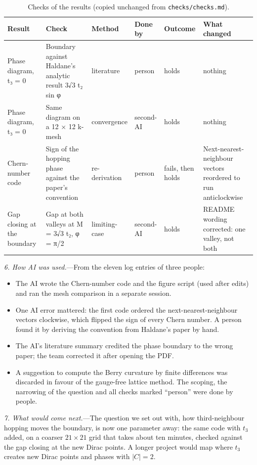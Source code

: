 \documentclass[reprint,aps,prl,superscriptaddress,amsmath,amssymb,floatfix]{revtex4-2}
\begin{document}
\begin{table}[t]
  \caption{Checks of the results (copied unchanged from \texttt{checks/checks.md}).}
  \label{tab:checks}
  \begin{ruledtabular}
  \begin{tabular}{p{2.6cm}p{4.0cm}lllp{3.8cm}}
    Result & Check & Method & Done by & Outcome & What changed \\
    \hline
    Phase diagram, t₃ = 0 & Boundary against Haldane's analytic result 3√3 t₂ sin φ & literature & person & holds & nothing \\
    Phase diagram, t₃ = 0 & Same diagram on a 12 × 12 k-mesh & convergence & second-AI & holds & nothing \\
    Chern-number code & Sign of the hopping phase against the paper's convention & re-derivation & person & fails, then holds & Next-nearest-neighbour vectors reordered to run anticlockwise \\
    Gap closing at the boundary & Gap at both valleys at M = 3√3 t₂, φ = π/2 & limiting-case & second-AI & holds & README wording corrected: one valley, not both \\
  \end{tabular}
  \end{ruledtabular}
\end{table}

\textit{6. How AI was used.}---From the eleven log entries of three people:
\begin{itemize}\setlength{\itemsep}{0pt}
  \item The AI wrote the Chern-number code and the figure script (used after edits) and ran the
  mesh comparison in a separate session.
  \item One AI error mattered: the first code ordered the next-nearest-neighbour vectors
  clockwise, which flipped the sign of every Chern number. A person found it by deriving the
  convention from Haldane's paper by hand.
  \item The AI's literature summary credited the phase boundary to the wrong paper; the team
  corrected it after opening the PDF.
  \item A suggestion to compute the Berry curvature by finite differences was discarded in favour
  of the gauge-free lattice method. The scoping, the narrowing of the question and all checks
  marked ``person'' were done by people.
\end{itemize}

\textit{7. What would come next.}---The question we set out with, how third-neighbour hopping
moves the boundary, is now one parameter away: the same code with $t_3$ added, on a coarser
$21\times21$ grid that takes about ten minutes, checked against the gap closing at the new Dirac
points. A longer project would map where $t_3$ creates new Dirac points and phases with $|C|=2$.
\end{document}
